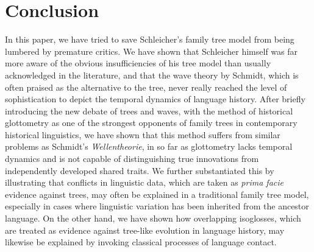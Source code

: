 \documentclass[svgnames,12pt]{scrartcl}
\begin{document}
{{\section{Conclusion}
In this paper, we have tried to save Schleicher's family tree model from being lumbered by premature
critics. We have shown that Schleicher himself was far more aware of the obvious insufficiencies of
his tree model than usually acknowledged in the literature, and that the wave theory by Schmidt,
which is often praised as the alternative to the tree, never really reached the level of
sophistication to depict the temporal dynamics of language history.  After briefly introducing the
new debate of trees and waves, with the method of historical glottometry as one of the strongest
opponents of family trees in contemporary historical linguistics, we have shown that this method
suffers from similar problems as Schmidt's \emph{Wellentheorie}, in so far as glottometry lacks
temporal dynamics and is not capable of distinguishing true innovations from independently developed
shared traits. We further substantiated this by illustrating that conflicts in linguistic data,
which are taken as \emph{prima facie} evidence against trees,
may often be explained in a traditional family tree model, especially in cases where linguistic variation
has been inherited from the ancestor language. On the other hand, we have shown how overlapping isoglosses, which are
treated as evidence against tree-like evolution in language history, may likewise be explained by
invoking classical processes of language contact.
 
}}
\end{document}
